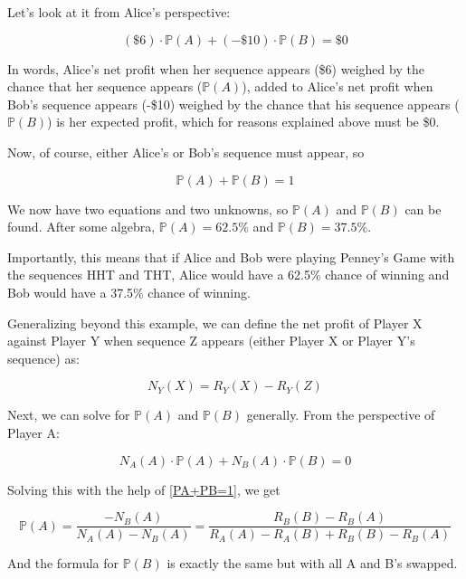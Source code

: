 \documentclass[english,12pt,a4paper,final]{article}
\begin{document}
Let's look at it from Alice's perspective:

\begin{equation*}
	(\$6) \cdot \mathbb{P}(A)  + (-\$10) \cdot \mathbb{P}(B) = \$0
\end{equation*}

In words, Alice's net profit when her sequence appears (\$6) weighed by the chance that her sequence appears ($\mathbb{P}(A)$), added to Alice's net profit when Bob's sequence appears (-\$10) weighed by the chance that his sequence appears ($\mathbb{P}(B)$) is her expected profit, which for reasons explained above must be \$0.

Now, of course, either Alice's or Bob's sequence must appear, so

\begin{equation}\label{PA+PB=1}
	\mathbb{P}(A) + \mathbb{P}(B) = 1
\end{equation}

We now have two equations and two unknowns, so $\mathbb{P}(A)$ and $\mathbb{P}(B)$ can be found. After some algebra, $\mathbb{P}(A) = 62.5\%$ and $\mathbb{P}(B) = 37.5\%$.

Importantly, this means that if Alice and Bob were playing Penney's Game with the sequences HHT and THT, Alice would have a 62.5\% chance of winning and Bob would have a 37.5\% chance of winning.

Generalizing beyond this example, we can define the net profit of Player X against Player Y when sequence Z appears (either Player X or Player Y's sequence) as:

\begin{equation*}
	N_Y(X) = R_Y(X) - R_Y(Z)
\end{equation*}

Next, we can solve for $\mathbb{P}(A)$ and $\mathbb{P}(B)$ generally. From the perspective of Player A:

\begin{equation*}
	N_A(A)\cdot\mathbb{P}(A) + N_B(A)\cdot\mathbb{P}(B) = 0
\end{equation*}

Solving this with the help of \eqref{PA+PB=1}, we get

\begin{equation*}
	\mathbb{P}(A) = \frac{-N_B(A)}{N_A(A)-N_B(A)} = \frac{R_B(B)-R_B(A)}{R_A(A)-R_A(B)+R_B(B)-R_B(A)}
\end{equation*}

And the formula for $\mathbb{P}(B)$ is exactly the same but with all A and B's swapped.
\end{document}
